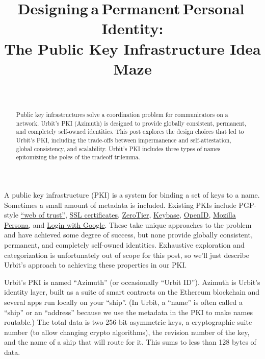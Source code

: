 \documentclass[twoside]{article}
\title{Designing a Permanent Personal Identity: \\ The Public Key Infrastructure Idea Maze}
\author{\authorname~\authorpatp \\ \affiliation}
\date{}
\begin{document}
\maketitle
\thispagestyle{firststyle}

\begin{abstract}
Public key infrastructures solve a coordination problem for communicators on a network. Urbit's PKI (Azimuth) is designed to provide globally consistent, permanent, and completely self-owned identities. This post explores the design choices that led to Urbit's PKI, including the trade-offs between impermanence and self-attestation, global consistency, and scalability. Urbit's PKI includes three types of names epitomizing the poles of the tradeoff trilemma.
\end{abstract}

\setcounter{page}{1}


A public key infrastructure (PKI) is a system for binding a set of keys to a name. Sometimes a small amount of metadata is included. Existing PKIs include PGP-style
\href{https://en.wikipedia.org/wiki/Web_of_trust}{``web of trust''},
\href{https://en.wikipedia.org/wiki/Certificate_authority}{SSL
certificates},
\href{https://www.zerotier.com/lf-announcement/}{ZeroTier},
\href{https://keybase.io/}{Keybase},
\href{https://openid.net/what-is-openid/}{OpenID},
\href{https://developer.mozilla.org/en-US/docs/Archive/Mozilla/Persona}{Mozilla
Persona}, and \href{https://developers.google.com/identity}{Login with
Google}. These take unique approaches to the problem and have achieved
some degree of success, but none provide globally consistent, permanent,
and completely self-owned identities. Exhaustive exploration and
categorization is unfortunately out of scope for this post, so we'll
just describe Urbit's approach to achieving these properties in our PKI.

Urbit's PKI is named ``Azimuth'' (or occasionally ``Urbit ID'').  Azimuth is Urbit's identity layer, built as a suite of smart contracts on the Ethereum blockchain and several apps run locally on your ``ship''. (In Urbit, a ``name'' is often called a ``ship'' or an ``address''
because we use the metadata in the PKI to make names routable.) The total
data is two 256-bit asymmetric keys, a cryptographic suite number (to
allow changing crypto algorithms), the revision number of the key, and
the name of a ship that will route for it. This sums to less than 128
bytes of data.
\end{document}
